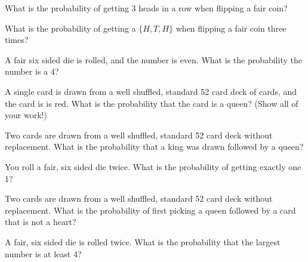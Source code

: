 \begin{problem}
\begin{subproblem}
    \vfill

    \clearpage

  \item What is the probability of getting 3 heads in a row when
    flipping a fair coin?

    \vfill

  \item What is the probability of getting a $\{H,T,H\}$ when flipping
    a fair coin three times?

    \vfill

  \item A fair six sided die is rolled, and the number is even.  What
    is the probability the number is a 4?

    \vfill

  \item A single card is drawn from a well shuffled, standard 52 card
    deck of cards, and the card is is red.  What is the probability
    that the card is a queen? (Show all of your work!)

    \vfill

    \clearpage

  \item Two cards are drawn from a well shuffled, standard 52 card
    deck without replacement.  What is the probability that a king was
    drawn followed by a queen?

    \vfill

  \item You roll a fair, six sided die twice. What is the probability
    of getting exactly one 1?

    \vfill

  \item Two cards are drawn from a well shuffled, standard 52 card
    deck without replacement. What is the probability of first picking
    a queen followed by a card that is not a heart?

    \vfill

  \item A fair, six sided die is rolled twice.  What is the
    probability that the largest number is at least 4?

    \vfill

  \end{subproblem}



\end{problem}



